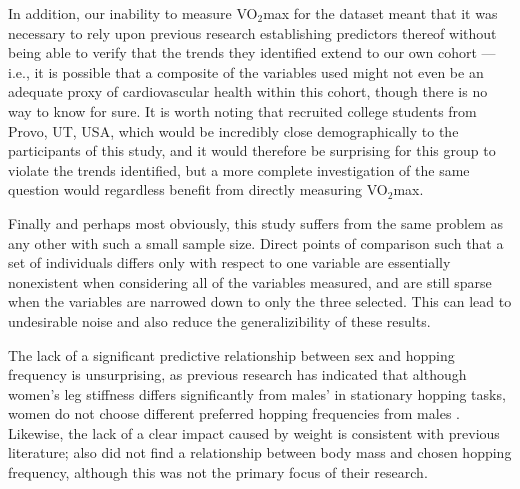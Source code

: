 \documentclass{article}
\begin{document}
In addition, our inability to measure VO$_2$max for the dataset meant that it was necessary to rely upon previous research establishing predictors thereof without being able to verify that the trends they identified extend to our own cohort --- i.e., it is possible that a composite of the variables used might not even be an adequate proxy of cardiovascular health within this cohort, though there is no way to know for sure. It is worth noting that \textcite{abut2016} recruited college students from Provo, UT, USA, which would be incredibly close demographically to the participants of this study, and it would therefore be surprising for this group to violate the trends \textcite{abut2016} identified, but a more complete investigation of the same question would regardless benefit from directly measuring VO$_2$max.

Finally and perhaps most obviously, this study suffers from the same problem as any other with such a small sample size. Direct points of comparison such that a set of individuals differs only with respect to one variable are essentially nonexistent when considering all of the variables measured, and are still sparse when the variables are narrowed down to only the three selected. This can lead to undesirable noise and also reduce the generalizibility of these results.

The lack of a significant predictive relationship between sex and hopping frequency is unsurprising, as previous research has indicated that although women's leg stiffness differs significantly from males' in stationary hopping tasks, women do not choose different preferred hopping frequencies from males \parencite{demirbuken2009,granata2002}. Likewise, the lack of a clear impact caused by weight is consistent with previous literature; \textcite{gutmann2013} also did not find a relationship between body mass and chosen hopping frequency, although this was not the primary focus of their research.
\end{document}
